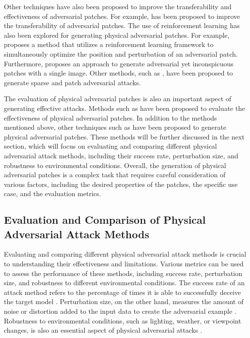 \documentclass[11pt]{article}
\begin{document}
Other techniques have also been proposed to improve the transferability and effectiveness of adversarial patches. For example, \cite{ref86} has been proposed to improve the transferability of adversarial patches. The use of reinforcement learning has also been explored for generating physical adversarial patches. For example, \cite{ref87} proposes a method that utilizes a reinforcement learning framework to simultaneously optimize the position and perturbation of an adversarial patch. Furthermore, \cite{ref88} proposes an approach to generate adversarial yet inconspicuous patches with a single image. Other methods, such as \cite{ref89}, have been proposed to generate sparse and patch adversarial attacks.

The evaluation of physical adversarial patches is also an important aspect of generating effective attacks. Methods such as \cite{ref90} have been proposed to evaluate the effectiveness of physical adversarial patches. In addition to the methods mentioned above, other techniques such as \cite{ref91} have been proposed to generate physical adversarial patches. These methods will be further discussed in the next section, which will focus on evaluating and comparing different physical adversarial attack methods, including their success rate, perturbation size, and robustness to environmental conditions. Overall, the generation of physical adversarial patches is a complex task that requires careful consideration of various factors, including the desired properties of the patches, the specific use case, and the evaluation metrics.

\subsection{Evaluation and Comparison of Physical Adversarial Attack Methods}

Evaluating and comparing different physical adversarial attack methods is crucial to understanding their effectiveness and limitations. Various metrics can be used to assess the performance of these methods, including success rate, perturbation size, and robustness to different environmental conditions. The success rate of an attack method refers to the percentage of times it is able to successfully deceive the target model \cite{ref5}. Perturbation size, on the other hand, measures the amount of noise or distortion added to the input data to create the adversarial example \cite{ref92}. Robustness to environmental conditions, such as lighting, weather, or viewpoint changes, is also an essential aspect of physical adversarial attacks \cite{ref8}.
\end{document}
